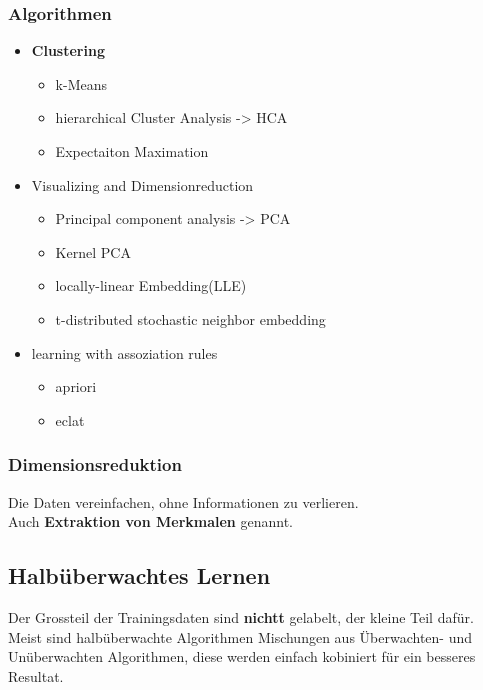 \documentclass[11pt]{article}
\providecommand{\tightlist}{%
      \setlength{\itemsep}{0pt}\setlength{\parskip}{0pt}}
\begin{document}
\subsubsection{Algorithmen}\label{algorithmen}

\begin{itemize}
\tightlist
\item
  \textbf{Clustering}

  \begin{itemize}
  \tightlist
  \item
    k-Means
  \item
    hierarchical Cluster Analysis -\textgreater{} HCA
  \item
    Expectaiton Maximation
  \end{itemize}
\item
  Visualizing and Dimensionreduction

  \begin{itemize}
  \tightlist
  \item
    Principal component analysis -\textgreater{} PCA
  \item
    Kernel PCA
  \item
    locally-linear Embedding(LLE)
  \item
    t-distributed stochastic neighbor embedding
  \end{itemize}
\item
  learning with assoziation rules

  \begin{itemize}
  \tightlist
  \item
    apriori
  \item
    eclat
  \end{itemize}
\end{itemize}

\subsubsection{Dimensionsreduktion}\label{dimensionsreduktion}

Die Daten vereinfachen, ohne Informationen zu verlieren.\\
Auch \textbf{Extraktion von Merkmalen} genannt.

    \subsection{Halbüberwachtes Lernen}\label{halbuxfcberwachtes-lernen}

Der Grossteil der Trainingsdaten sind \textbf{nichtt} gelabelt, der
kleine Teil dafür. Meist sind halbüberwachte Algorithmen Mischungen aus
Überwachten- und Unüberwachten Algorithmen, diese werden einfach
kobiniert für ein besseres Resultat.
\end{document}
